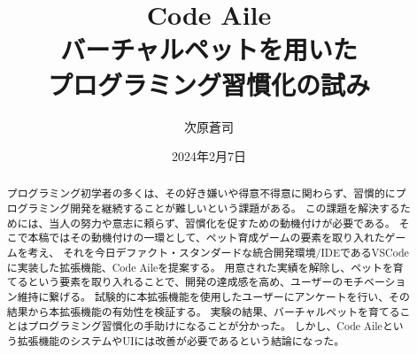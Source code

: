\documentclass[12pt,twoside]{jbook}
\begin{document}
\title{%
  Code Aile\\バーチャルペットを用いた\\プログラミング習慣化の試み
}


\author{%
  次原蒼司
}

\date{2024年2月7日}






\maketitle


\begin{abstract}
 プログラミング初学者の多くは、その好き嫌いや得意不得意に関わらず、習慣的にプログラミング開発を継続することが難しいという課題がある。
この課題を解決するためには、当人の努力や意志に頼らず、習慣化を促すための動機付けが必要である。
そこで本稿ではその動機付けの一環として、ペット育成ゲームの要素を取り入れたゲームを考え、
それを今日デファクト・スタンダードな統合開発環境/IDEであるVSCodeに実装した拡張機能、Code Aileを提案する。
用意された実績を解除し、ペットを育てるという要素を取り入れることで、開発の達成感を高め、ユーザーのモチベーション維持に繋げる。
試験的に本拡張機能を使用したユーザーにアンケートを行い、その結果から本拡張機能の有効性を検証する。
実験の結果、バーチャルペットを育てることはプログラミング習慣化の手助けになることが分かった。
しかし、Code Aileという拡張機能のシステムやUIには改善が必要であるという結論になった。

\end{abstract}
\end{document}
